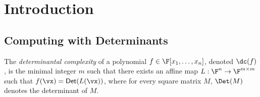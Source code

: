 
























































































\section{Introduction}

\subsection{Computing with Determinants}
The \emph{determinantal complexity} of a polynomial $f \in \F[x_1, \ldots, x_n]$, denoted $\dc(f)$, is the minimal integer $m$ such that there exists an affine map $L : \F^n \to \F^{m \times m}$ such that $f(\vx) = \mathsf{Det}(L(\vx))$, where for every square matrix $M$, $\Det(M)$ denotes the determinant of $M$.

